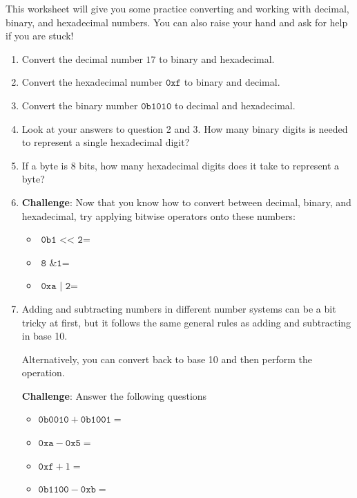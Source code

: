 \documentclass{./worksheet}
\begin{document}
This worksheet will give you some practice converting and working with decimal, binary, and hexadecimal numbers.
You can also raise your hand and ask for help if you are stuck!
\begin{enumerate}

\item Convert the decimal number $17$ to binary and hexadecimal.

\vspace{0.5in}

\item Convert the hexadecimal number $\texttt{0xf}$ to binary and decimal.

\vspace{0.5in}

\item Convert the binary number $\texttt{0b1010}$ to decimal and hexadecimal.

\vspace{0.5in}

\item Look at your answers to question 2 and 3. How many binary digits is needed to represent a single hexadecimal digit?

\item If a byte is 8 bits, how many hexadecimal digits does it take to represent a byte?

\item \textbf{Challenge}: Now that you know how to convert between decimal, binary, and hexadecimal, try applying bitwise operators onto these numbers:
\begin{itemize}
\item $\texttt{0b1 << 2} =$
\item $\texttt{8 \& 1} =$
\item $\texttt{0xa | 2} =$
\end{itemize}

\vspace{0.5in}

\item Adding and subtracting numbers in different number systems can be a bit
tricky at first, but it follows the same general rules as adding and subtracting in base 10.

Alternatively, you can convert back to base 10 and then perform the operation.

\textbf{Challenge}: Answer the following questions

\begin{itemize}
\item $\texttt{0b0010} + \texttt{0b1001} =$
\item $\texttt{0xa} - \texttt{0x5} =$
\item $\texttt{0xf} + 1 =$
\item $\texttt{0b1100} - \texttt{0xb} =$
\end{itemize}

\end{enumerate}
\end{document}
